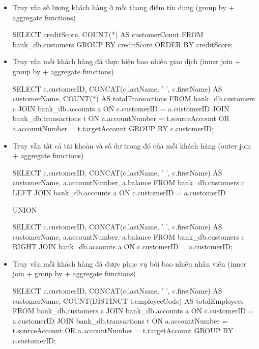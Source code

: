 \begin{itemize}
     \item Truy vấn số lượng khách hàng ở mỗi thang điểm tín dụng (group by + aggregate functions)
    \begin{MySQLCode}
    SELECT 
        creditScore,
        COUNT(*) AS customerCount
    FROM 
        bank_db.customers
    GROUP BY 
        creditScore
    ORDER BY 
        creditScore;
    \end{MySQLCode}

    \item Truy vấn mỗi khách hàng đã thực hiện bao nhiêu giao dịch (inner join + group by + aggregate functions)
    \begin{MySQLCode}
    SELECT 
        c.customerID,
        CONCAT(c.lastName, ' ', c.firstName) AS customerName,
        COUNT(*) AS totalTransactions
    FROM
	   bank_db.customers c
    JOIN
        bank_db.accounts a ON c.customerID = a.customerID
    JOIN 
        bank_db.transactions t ON a.accountNumber = t.sourceAccount OR a.accountNumber = t.targetAccount
    GROUP BY 
        c.customerID;
    \end{MySQLCode}

    \item Truy vẫn tất cả tài khoản và số dư trong đó của mỗi khách hàng (outer join + aggregate functions)
    \begin{MySQLCode}
    SELECT 
        c.customerID,
        CONCAT(c.lastName, ' ', c.firstName) AS customerName,
        a.accountNumber,
        a.balance
    FROM 
        bank_db.customers c
    LEFT JOIN 
        bank_db.accounts a ON c.customerID = a.customerID

    UNION

    SELECT 
        c.customerID,
        CONCAT(c.lastName, ' ', c.firstName) AS customerName,
        a.accountNumber,
        a.balance
    FROM 
        bank_db.customers c
    RIGHT JOIN 
        bank_db.accounts a ON c.customerID = a.customerID;
    \end{MySQLCode}

    \item Truy vấn mỗi khách hàng đã được phục vụ bởi bao nhiêu nhân viên (inner join + group by + aggregate functions)
    \begin{MySQLCode}
    SELECT 
        c.customerID,
        CONCAT(c.lastName, ' ', c.firstName) AS customerName,
        COUNT(DISTINCT t.employeeCode) AS totalEmployees
    FROM 
        bank_db.customers c
    JOIN 
        bank_db.accounts a ON c.customerID = a.customerID
    JOIN 
        bank_db.transactions t ON a.accountNumber = t.sourceAccount OR a.accountNumber = t.targetAccount
    GROUP BY 
        c.customerID;
    \end{MySQLCode}

\end{itemize}

